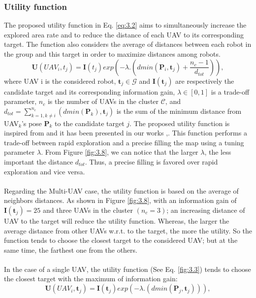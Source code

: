 \documentclass[11pt,openany]{book}
\begin{document}
\subsubsection{Utility function}
The proposed utility function in Eq. \ref{eq:3.2} aims to simultaneously increase the explored area rate and to reduce the distance of each UAV to its corresponding target. The function also considers the average of distances between each robot in the group and this target in order to maximize distances among robots.
\begin{equation}
    \mathbf{U}(UAV_i,t_j)=\mathbf{I}(t_j)exp(-\lambda.(dmin(\mathbf{P}_i,\mathbf{t}_j)+\frac{n_c-1}{d_{tot}})),
\end{equation}
where UAV i is the considered robot, $\mathbf{t}_j \in \mathcal{G}$ and $\mathbf{I}(\mathbf{t}_j)$ are respectively the candidate target and its corresponding information gain, $\lambda \in [0,1]$ is a trade-oﬀ parameter, $n_c$ is the number of UAVs in the cluster $\mathcal{C}$, and $d_{tot} = \sum_{k=1, k\neq i}^{n_c}(dmin(\mathbf{P}_k),\mathbf{t}_j) $ is the sum of the minimum distance from UAV$_k$'s pose $\mathbf{P}_k$ to the candidate target $j$. The proposed utility function is inspired from \cite{heng2015efficient} and it has been presented in our works \cite{mahdoui2017cooperative},\cite{mahdoui2018cooperative}. This function performs a trade-oﬀ between rapid exploration and a precise ﬁlling the map using a tuning parameter $\lambda$. From Figure \ref{fig:3.8}, we can notice that the larger $\lambda$, the less important the distance $d_{tot}$. Thus, a precise ﬁlling is favored over rapid exploration and vice versa.\\\\
Regarding the Multi-UAV case, the utility function is based on the average of neighbors distances. As shown in Figure \ref{fig:3.8}, with an information gain of $\mathbf{I}(\mathbf{t}_j)=25$ and three UAVs in the cluster $(n_c=3)$; an increasing distance of UAV to the target will reduce the utility function. Whereas, the larger the average distance from other UAVs w.r.t. to the target, the more the utility. So the function tends to choose the closest target to the considered UAV; but at the same time, the farthest one from the others.\\\\
In the case of a single UAV, the utility function (See Eq. \ref{fig:3.3}) tends to choose the closest target with the maximum of information gain:
\begin{equation}
    \mathbf{U}(UAV_i,\mathbf{t}_j)=\mathbf{I}(\mathbf{t}_j)exp(-\lambda.(dmin(\mathbf{P}_j,\mathbf{t}_j))),
\end{equation}
\end{document}
